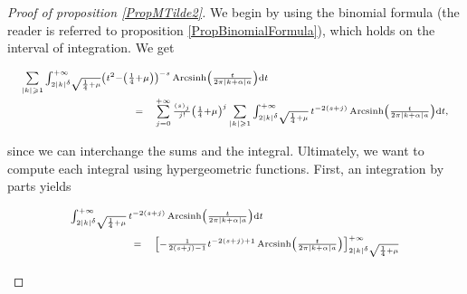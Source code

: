 \documentclass{jams-l}
\theoremstyle{definition}
\theoremstyle{remark}
\numberwithin{equation}{section}
\DeclareMathOperator{\arcsinh}{Arcsinh}
\begin{document}
                \begin{proof}[Proof of proposition \ref{PropMTilde2}]
                
                    We begin by using the binomial formula (the reader is referred to proposition \ref{PropBinomialFormula}), which holds on the interval of integration. We get
                    
                    \[ \begin{array}{lll}
                            \multicolumn{3}{l}{\scriptstyle \sum\limits_{\left \vert k \right \vert \geqslant 1} \int_{2 \left \vert k \right \vert^{\delta} \sqrt{\frac{1}{4} + \mu}}^{+ \infty} \left( t^2 - \left( \frac{1}{4} + \mu \right) \right)^{-s} \arcsinh \left( \frac{t}{2 \pi \left \vert k + \alpha \right \vert a} \right) \mathrm{d}t} \\[1em]
                            
                            \qquad \qquad \qquad \qquad & \scriptstyle = & \scriptstyle \sum\limits_{j = 0}^{+ \infty} \frac{\left( s \right)_j}{j!} \left( \frac{1}{4} + \mu \right)^j \sum\limits_{\left \vert k \right \vert \geqslant 1} \int_{2 \left \vert k \right \vert^{\delta} \sqrt{\frac{1}{4} + \mu}}^{+ \infty} t^{-2 \left( s + j \right)} \arcsinh \left( \frac{t}{2 \pi \left \vert k + \alpha \right \vert a} \right) \mathrm{d}t,
                        \end{array} \]
                    
                    \noindent since we can interchange the sums and the integral. Ultimately, we want to compute each integral using hypergeometric functions. First, an integration by parts yields
                    
                    \[ \begin{array}{lll}
                            \multicolumn{3}{l}{\scriptstyle \int_{2 \left \vert k \right \vert^{\delta} \sqrt{\frac{1}{4} + \mu}}^{+ \infty} t^{-2 \left( s + j \right)} \arcsinh \left( \frac{t}{2 \pi \left \vert k + \alpha \right \vert a} \right) \mathrm{d}t} \\[1em]
                            
                            \qquad \qquad & \scriptstyle = & \scriptstyle \left[ - \frac{1}{2 \left( s + j \right) - 1} t^{- 2 \left( s + j \right) + 1} \arcsinh \left( \frac{t}{2 \pi \left \vert k + \alpha \right \vert a} \right) \right]_{2 \left \vert k \right \vert^{\delta} \sqrt{\frac{1}{4} + \mu}}^{+ \infty} \\[1em]
                            

\end{array}\]
\end{proof}
\end{document}
